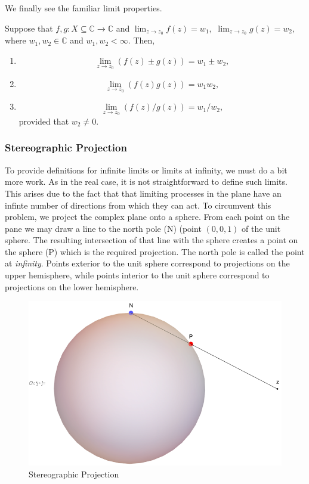 \documentclass[12pt]{book}
\begin{document}
We finally see the familiar limit properties. 
\begin{thm}
    Suppose that $f, g: X \subseteq \mathbb{C} \rightarrow \mathbb{C}$ and $\lim_{z \rightarrow z_0}f(z) = w_1,$ $\lim_{z \rightarrow z_0}g(z) = w_2,$ where $w_1, w_2 \in \mathbb{C}$ and $w_1, w_2 < \infty.$ Then,
    \begin{enumerate}[label = {(\roman*)}] 
        \item
            $$
                \lim_{z \rightarrow z_0} (f(z) \pm g(z)) = w_1 \pm w_2,
            $$
        \item
            $$
                \lim_{z \rightarrow z_0} (f(z)g(z)) = w_1w_2,
            $$
        \item
            $$
                \lim_{z \rightarrow z_0} (f(z) / g(z)) = w_1 / w_2,
            $$
            provided that $w_2 \neq 0.$
    \end{enumerate}
\end{thm}

\subsubsection{Stereographic Projection}
To provide definitions for infinite limits or limits at infinity, we must do a bit more work. As in the real case, it is not straightforward to define such limits. This arises due to the fact that that limiting processes in the plane have an infinte number of directions from which they can act. To circumvent this problem, we project the complex plane onto a sphere. From each point on the pane we may draw a line to the north pole (N) (point $(0, 0, 1)$ of the unit sphere. The resulting intersection of that line with the sphere creates a point on the sphere (P) which is the required projection. The north pole is called the point at \textit{infinity}. Points exterior to the unit sphere correspond to projections on the upper hemisphere, while points interior to the unit sphere correspond to projections on the lower hemisphere.

\begin{figure}[H]
    \centering
    \includegraphics[trim = 20 0 0 0, scale = 0.7, clip]{./figs/chapter_1/stereo_projection.eps}
    \caption{Stereographic Projection}
\end{figure}
\end{document}
